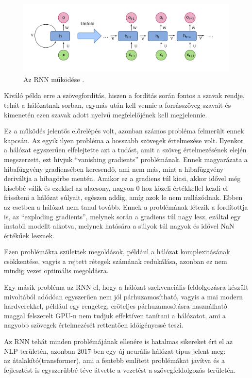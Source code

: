 \begin{figure}[h]
\centering
\includegraphics[scale=0.2]{images/rnn.png}
\caption{Az RNN működése \cite{rnn}.}
\label{fig:rnn}
\end{figure}

Kiváló példa erre a szövegfordítás, hiszen a fordítás során fontos a szavak rendje, tehát a hálózatnak sorban, egymás után kell vennie a forrásszöveg szavait és kimenetén ezen szavak adott nyelvű megfelelőjének kell megjelennie.

Ez a működés jelentős előrelépés volt, azonban számos probléma felmerült ennek kapcsán. Az egyik ilyen probléma a hosszabb szövegek értelmezése volt. Ilyenkor a hálózat egyszerűen elfelejtette azt a tudást, amit a szöveg értelmezésének elején megszerzett, ezt hívjuk “vanishing gradients” problémának. Ennek magyarázata a hibafüggvény gradiensében keresendő, ami nem más, mint a hibafüggvény deriváltja a hibagörbe mentén. Amikor ez a gradiens túl kicsi, akkor idővel még kisebbé válik és ezekkel az alacsony, nagyon 0-hoz közeli értékkellel kezdi el frissíteni a hálózat súlyait, egészen addig, amíg azok le nem nullázódnak. Ebben az esetben a hálózat nem tanul tovább. Ennek a problémának létezik a fordítottja is, az “exploding gradients”, melynek során a gradiens túl nagy lesz, ezáltal egy instabil modellt alkotva, melynek hatására a súlyok túl nagyok és idővel NaN értékűek lesznek.

Ezen problémákra születtek megoldások, például a hálózat komplexitásának csökkentése, vagyis a rejtett rétegek számának redukálása, azonban ez nem mindig vezet optimális megoldásra.

Egy másik probléma az RNN-el, hogy a hálózat szekvenciális feldolgozásra készült mivoltából adódóan egyszerűen nem jól párhuzamosítható, vagyis a mai modern hardverekkel, például egy rengeteg, erőteljes párhuzamosításra használható maggal felszerelt GPU-n nem tudjuk effektíven tanítani a hálózatot, ami a nagyobb szövegek értelmezését rettentően időigényessé teszi.

Az RNN tehát minden problémájának ellenére is hatalmas sikereket ért el az NLP területén, azonban 2017-ben egy új neurális hálózat típus jelent meg:\\
az átalakító(transformer), ami a fentebb említett problémákat javítva és a fejlesztést is egyszerűbbé téve átvette a vezetést a szövegfeldolgozás területén.

